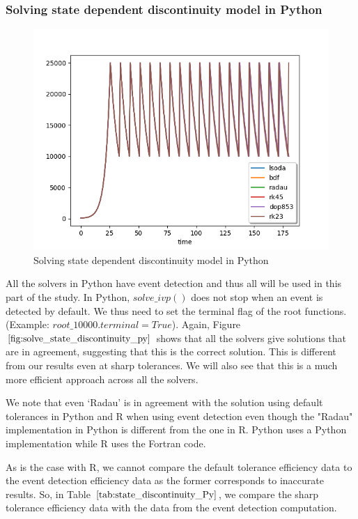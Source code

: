 \subsubsection{Solving state dependent discontinuity model in Python}
\begin{figure}[h]
\centering
\includegraphics[width=0.7\linewidth]{./figures/solve_state_discontinuity_py}
\caption{Solving state dependent discontinuity model in Python}
\label{fig:solve_state_discontinuity_py}
\end{figure}
All the solvers in Python have event detection and thus all will be used in this part of the study. In Python, $solve\_ivp()$ does not stop when an event is detected by default. We thus need to set the terminal flag of the root functions.
(Example: $root\_10000.terminal = True$).
Again, Figure $\ref{fig:solve_state_discontinuity_py}$ shows that all the solvers give solutions that are in agreement, suggesting that this is the correct solution. This is different from our results even at sharp tolerances. We will also see that this is a much more efficient approach across all the solvers.

We note that even `Radau' is in agreement with the solution using default tolerances in Python and R when using event detection even though the "Radau" implementation in Python is different from the one in R. Python uses a Python implementation while R uses the Fortran code.

As is the case with R, we cannot compare the default tolerance efficiency data to the event detection efficiency data as the former corresponds to inaccurate results. So, in Table $\ref{tab:state_discontinuity_Py}$, we compare the sharp tolerance efficiency data with the data from the event detection computation.

